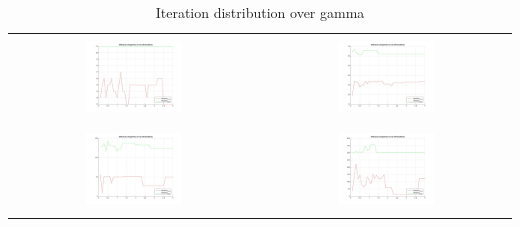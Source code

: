 \documentclass[]{report}
\begin{document}
\begin{table}[h]
\begin{tabular}{| c | c |}
\hline
 & \\
\includegraphics[width=0.4\textwidth]{./images/GammaToIterations_0150.jpg} & \includegraphics[width=0.4\textwidth]{./images/GammaToIterations_0250.jpg} \\
 & \\
\hline
 & \\
\includegraphics[width=0.4\textwidth]{./images/GammaToIterations_0350.jpg} & \includegraphics[width=0.4\textwidth]{./images/GammaToIterations_0450.jpg} \\
 & \\
\hline
\end{tabular}
\caption{Iteration distribution over gamma}
\label{tab:GammaToIterations}
\end{table}
\end{document}
